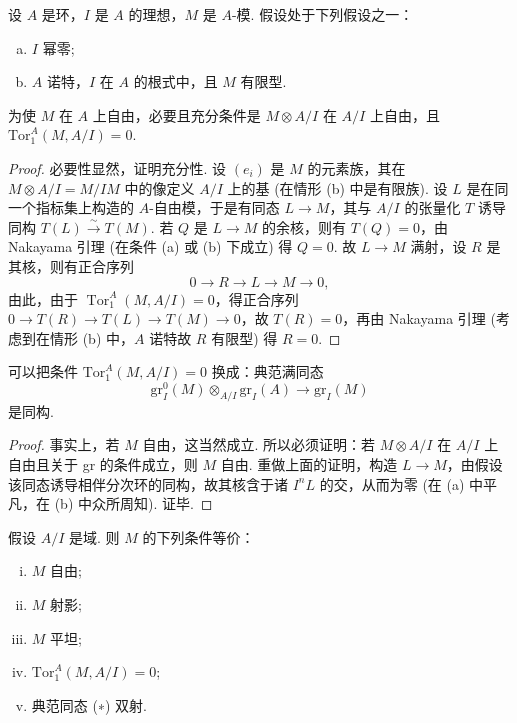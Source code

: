 \begin{proposition}\label{prop:IV.4.1}
设 $A$ 是环，$I$ 是 $A$ 的理想，$M$ 是 $A$-模. 假设处于下列假设之一：
\begin{enumerate}[a)]
\item $I$ 幂零; 
\item $A$ 诺特，$I$ 在 $A$ 的根式中，且 $M$ 有限型.
\end{enumerate}
为使 $M$ 在 $A$ 上自由，必要且充分条件是 $M \otimes A/I$ 在 $A/I$ 上自由，且 $\mathrm{Tor}_{1}^{A}(M, A/I) = 0$.
\end{proposition}

\begin{proof}
必要性显然，证明充分性. 设 $(e_i)$ 是 $M$ 的元素族，其在 $M \otimes A/I = M/IM$ 中的像定义 $A/I$ 上的基 (在情形 (b) 中是有限族). 设 $L$ 是在同一个指标集上构造的 $A$-自由模，于是有同态 $L \to M$，其与 $A/I$ 的张量化 $T$ 诱导同构 $T(L) \stackrel{\sim}{\longrightarrow} T(M)$. 若 $Q$ 是 $L \to M$ 的余核，则有 $T(Q) = 0$，由 Nakayama 引理 (在条件 (a) 或 (b) 下成立) 得 $Q = 0$. 故 $L \to M$ 满射，设 $R$ 是其核，则有正合序列
\[
0 \longrightarrow R \longrightarrow L \longrightarrow M \longrightarrow 0,
\]
由此，由于 $\operatorname{Tor}_{1}^{A}(M, A/I) = 0$，得正合序列 $0 \to T(R) \to T(L) \to T(M) \to 0$，故 $T(R) = 0$，再由 Nakayama 引理 (考虑到在情形 (b) 中，$A$ 诺特故 $R$ 有限型) 得 $R = 0$.
\end{proof}

\begin{corollary}\label{cor:IV.4.2}
可以把条件 $\mathrm{Tor}_{1}^{A}(M, A/I) = 0$ 换成：典范满同态
\begin{equation}
\mathrm{gr}_{I}^{0}(M) \otimes_{A/I} \mathrm{gr}_{I}(A) \longrightarrow \mathrm{gr}_{I}(M) \tag{($*$)}
\end{equation}
是同构.
\end{corollary}

\begin{proof}
事实上，若 $M$ 自由，这当然成立. 所以必须证明：若 $M \otimes A/I$ 在 $A/I$ 上自由且关于 gr 的条件成立，则 $M$ 自由. 重做上面的证明，构造 $L \to M$，由假设该同态诱导相伴分次环的同构，故其核含于诸 $I^n L$ 的交，从而为零 (在 (a) 中平凡，在 (b) 中众所周知). 证毕.
\end{proof}

\begin{corollary}\label{cor:IV.4.3}
假设 $A/I$ 是域. 则 $M$ 的下列条件等价：
\begin{enumerate}[(i)]
\item $M$ 自由; 
\item $M$ 射影; 
\item $M$ 平坦; 
\item $\mathrm{Tor}_{1}^{A}(M, A/I) = 0$; 
\item 典范同态 (∗) 双射.
\end{enumerate}
\end{corollary}

